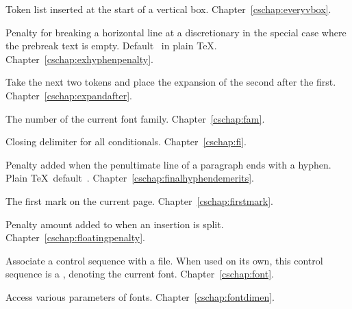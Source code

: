 \begin{glossinventory}
\item [\cs{everyvbox}]
      Token list inserted at the start of a vertical box.
Chapter~\ref{cschap:everyvbox}.

\item [\cs{exhyphenpenalty}]
      Penalty for breaking a horizontal line at a discretionary
      in the special case where the prebreak text is empty. 
      Default~ in plain \TeX.
Chapter~\ref{cschap:exhyphenpenalty}.

\item [\cs{expandafter}] 
      Take the next two tokens and place the 
      expansion  of the second after the first.
Chapter~\ref{cschap:expandafter}.

\item [\cs{fam}]
      The number of the current font family.
Chapter~\ref{cschap:fam}.

\item [\cs{fi}]
      Closing delimiter for all conditionals.
Chapter~\ref{cschap:fi}.

\item [\cs{finalhyphendemerits}]
      Penalty added when the penultimate line of a 
      paragraph ends with a hyphen. 
      Plain \TeX\ default~.
Chapter~\ref{cschap:finalhyphendemerits}.

\item [\cs{firstmark}]
      The first mark on the current page.
Chapter~\ref{cschap:firstmark}.

\item [\cs{floatingpenalty}]
      Penalty amount added to 
 \alt
      when an insertion is split.
Chapter~\ref{cschap:floatingpenalty}.

\item [\cs{font\gr{control sequence}\gr{equals}\gr{file name}\gr{at clause}}]
      Associate a control sequence with a  file.
      When used on its own, this control sequence is a ,
      denoting the current font.
Chapter~\ref{cschap:font}.

\item [\cs{fontdimen\gr{number}\gr{font}}]
      Access various parameters of fonts.
Chapter~\ref{cschap:fontdimen}.


\end{glossinventory}
